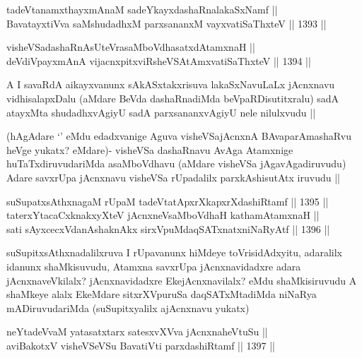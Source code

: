 \begin{shl}
tadeVtanamxthayxmAnaM sadeYkayxdashaRnalakaSxNamf || \\
BavatayxtiVva saMshudadhxM parxsananxM vayxvatiSaThxteV ||  1393 ||  
\end{shl}
				
\begin{shl}
visheVSadashaRnAsUteVrasaMboVdhasatxdA\s \s tamxnaH || \\
deVdiVpayxmAnA vijacnxpitxviRsheVSAtAmx\s vatiSaThxteV ||  1394 ||  
\end{shl}

\begin{artha}
A I savaRdA aikayxvanunx sAkASxtakxrisuva lakaSxNavuLaLx jAcnxnavu vidhisalapxDalu (aMdare BeVda dashaRnadiMda beVpaRDisutitxralu) sadA atayxMta shudadhxvAgiyU sadA parxsananxvAgiyU nele nilulxvudu ||
\end{artha}

\begin{artha}
(hAgAdare `\stext' eMdu edadxvanige Aguva visheVSajAcnxnA BAvaparAmashaRvu heVge yukatx? eMdare)- visheVSa dashaRnavu AvAga Atamxnige huTaTxdiruvudariMda asaMboVdhavu (aMdare visheVSa jAgavAgadiruvudu) Adare savxrUpa jAcnxnavu visheVSa rUpadalilx parxkAshisutAtx iruvudu ||
\end{artha}

\begin{shl}
suSupatxsAthxnagaM rUpaM tadeVtatApxrXkapxrXdashiRtamf ||  1395 ||  \\
taterxYtacaCxknakxyXteV jAcnxneV\s saMboVdhaH kathamAtamxnaH || \\
sati sAyxcecxVdanAshaknAkx sirxVpuMdaqSATxnatxniNaRyAtf ||  1396 ||  
\end{shl}

\begin{artha}
suSupitxsAthxnadalilxruva I rUpavanunx hiMdeye toVrisidAdxyitu, adaralilx idanunx shaMkisuvudu, Atamxna savxrUpa jAcnxnavidadxre adara jAcnxnaveVkilalx? jAcnxnavidadxre EkejAcnxnavilalx? eMdu shaMkisiruvudu A shaMkeye alalx EkeMdare sitxrXVpuruSa daqSATxMtadiMda niNaRya mADiruvudariMda (suSupitxyalilx ajAcnxnavu yukatx)
\end{artha}


\begin{shl}
neYtadeVvaM yatasatxtarx satesxvXVva jAcnxnaheVtuSu || \\
aviBakotxV visheVSeVSu BavatiVti parxdashiRtamf ||  1397 ||  
\end{shl}


